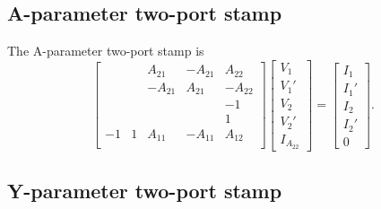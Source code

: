 \documentclass[a4paper, 12pt]{article}
\begin{document}
\subsection{A-parameter two-port stamp}

The A-parameter two-port stamp is
%
\begin{equation}
  \begin{bmatrix}
   &   &  A_{21} & -A_{21} & A_{22} \\ 
   &   & -A_{21} & A_{21}  & -A_{22} \\
   &   &         &        & -1    \\
   &   &         &        &  1    \\
   -1 & 1  & A_{11} & -A_{11} & A_{12} \\
  \end{bmatrix}
  \begin{bmatrix}
    V_1 \\ V_1' \\ V_2 \\ V_2' \\ I_{A_{22}}
  \end{bmatrix}
=
\begin{bmatrix}
  I_1 \\ I_1' \\ I_2 \\ I_2' \\ 0
\end{bmatrix}.
\end{equation}
%
%



\subsection{Y-parameter two-port stamp}
\end{document}
